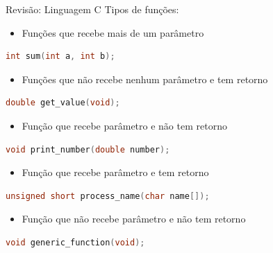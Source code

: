 \begin{frame}[fragile]{Revisão: Linguagem C}
    Tipos de funções:
    \begin{itemize}
        \item Funções que recebe mais de um parâmetro
    \end{itemize}

\begin{lstlisting}[language=C,basicstyle=\ttfamily\scriptsize]
int sum(int a, int b);
\end{lstlisting}

    \begin{itemize}
        \item Funções que não recebe nenhum parâmetro e tem retorno
    \end{itemize}

\begin{lstlisting}[language=C,basicstyle=\ttfamily\scriptsize]
double get_value(void);
\end{lstlisting}

    \begin{itemize}
        \item Função que recebe parâmetro e não tem retorno
    \end{itemize}

\begin{lstlisting}[language=C,basicstyle=\ttfamily\scriptsize]
void print_number(double number);
\end{lstlisting}

    \begin{itemize}
        \item Função que recebe parâmetro e tem retorno
    \end{itemize}

\begin{lstlisting}[language=C,basicstyle=\ttfamily\scriptsize]
unsigned short process_name(char name[]);
\end{lstlisting}

    \begin{itemize}
        \item Função que não recebe parâmetro e não tem retorno
    \end{itemize}

\begin{lstlisting}[language=C,basicstyle=\ttfamily\scriptsize]
void generic_function(void);
\end{lstlisting}
    
        
\end{frame}